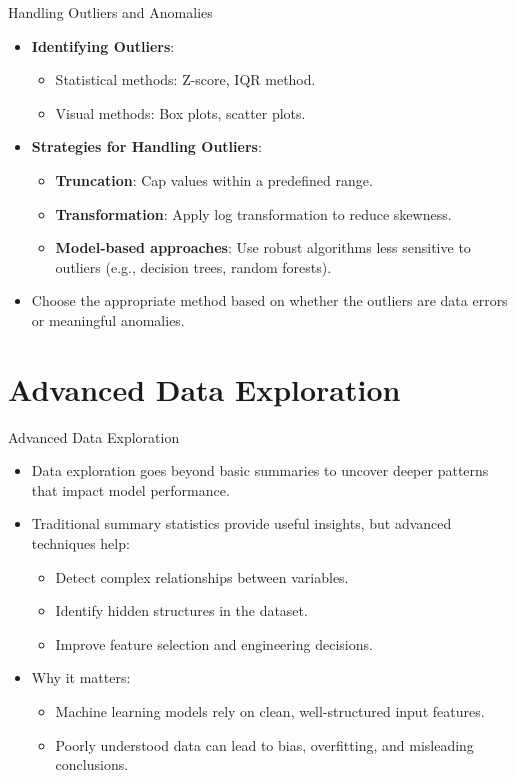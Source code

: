 \documentclass[aspectratio=169,xcolor=dvipsnames]{beamer}
\begin{document}
\begin{frame}{Handling Outliers and Anomalies}
\begin{itemize}
    \setlength\itemsep{0.25cm}
    \item \textbf{Identifying Outliers}:
    \begin{itemize}
        \item Statistical methods: Z-score, IQR method.
        \item Visual methods: Box plots, scatter plots.
    \end{itemize}
    \item \textbf{Strategies for Handling Outliers}:
    \begin{itemize}
        \item \textbf{Truncation}: Cap values within a predefined range.
        \item \textbf{Transformation}: Apply log transformation to reduce skewness.
        \item \textbf{Model-based approaches}: Use robust algorithms less sensitive to outliers (e.g., decision trees, random forests).
    \end{itemize}
    \item Choose the appropriate method based on whether the outliers are data errors or meaningful anomalies.
\end{itemize}
\end{frame}

\section{Advanced Data Exploration}

\begin{frame}{Advanced Data Exploration}
\begin{itemize}
    \setlength\itemsep{0.5cm}
    \item Data exploration goes beyond basic summaries to uncover deeper patterns that impact model performance.
    \item Traditional summary statistics provide useful insights, but advanced techniques help:
    \begin{itemize}
        \item Detect complex relationships between variables.
        \item Identify hidden structures in the dataset.
        \item Improve feature selection and engineering decisions.
    \end{itemize}
    \item Why it matters:
    \begin{itemize}
        \item Machine learning models rely on clean, well-structured input features.
        \item Poorly understood data can lead to bias, overfitting, and misleading conclusions.
    \end{itemize}
\end{itemize}
\end{frame}
\end{document}
